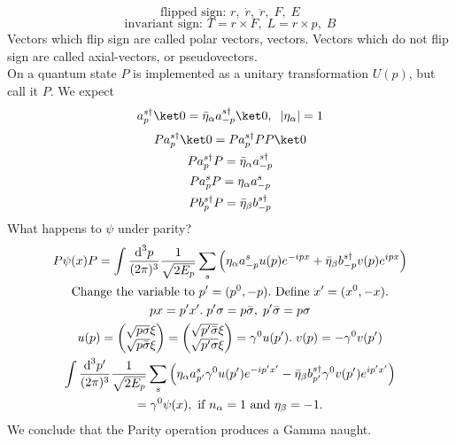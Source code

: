 \documentclass[]{scrartcl}
\begin{document}
\begin{equation}
	\text{flipped sign: } r,\;\dot r,\; \ddot r,\; F,\; E
\end{equation}
\begin{equation}
	\text{invariant sign: } T = r\times F,\; L = r\times p,\; B
\end{equation}
Vectors which flip sign are called polar vectors, vectors. Vectors which do not flip sign are called axial-vectors, or pseudovectors.\\
On a quantum state $P$ is implemented as a unitary transformation $U(p)$, but call it $P$. We expect
$$
a_p^{s\dagger}\ket 0 = \bar\eta_\alpha a_{-p}^{s\dagger}\ket0, \;\; |\eta_\alpha| = 1
$$
\begin{gather}
	Pa_p^{s\dagger}\ket 0 = P a_p^{s\dagger} PP \ket 0\\
	P a_p^{s\dagger}P = \bar\eta_\alpha a_{-p}^{s\dagger}\\
	Pa_p^s P = \eta_\alpha a_{-p}^s\\
	P b_p^{s\dagger}P = \bar\eta_\beta b_{-p}^{s\dagger}
\end{gather}
What happens to $\psi$ under parity?
\begin{gather}
	P\psi(x) P = \int \frac{\text d^3p}{(2\pi)^3}\frac{1}{\sqrt{2E_p}}\sum_s \left(\eta_\alpha a_{-p}^s u(p) e^{-ipx} + \bar\eta_\beta b_{-p}^{s\dagger}v(p)e^{ipx}\right)\\
	\text{Change the variable to } p' = (p^0, -p). \text{ Define } x' = (x^0, -x).\nonumber\\
	px = p'x'.\; p'\sigma = p\bar\sigma,\; p'\bar\sigma = p\sigma\nonumber\\
	u(p) = 
	\begin{pmatrix}
		\sqrt{p\sigma} \xi\\ \sqrt{p\bar\sigma}\xi
	\end{pmatrix} =
	\begin{pmatrix}
		\sqrt{p'\bar\sigma} \xi \\ \sqrt{p'\sigma}\xi
	\end{pmatrix} =
	\gamma^0 u(p').\; v(p) = -\gamma^0 v(p') \nonumber\\
	\int\frac{\text d^3p'}{(2\pi)^3}\frac{1}{\sqrt{2E_p}}\sum_s\left(\eta_\alpha a^s_{p'}\gamma^0u(p') e^{-ip'x'} - \bar\eta_\beta b_{p'}^{s\dagger} \gamma^0v(p') e^{ip'x'}\right)\\
	= \gamma^0\psi(x), \text{ if $n_\alpha = 1$ and $\eta_\beta = -1$.}
\end{gather}
We conclude that the Parity operation produces a Gamma naught.
\end{document}
